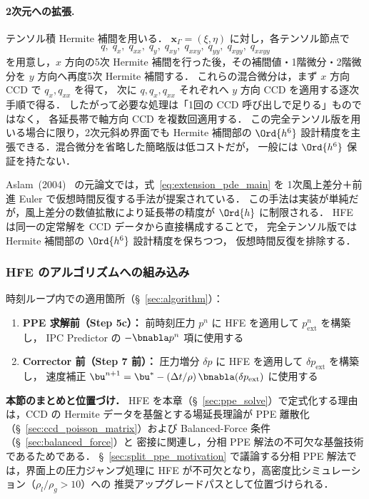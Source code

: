 \paragraph{2次元への拡張.}
テンソル積 Hermite 補間を用いる．
$\bm{x}_\Gamma = (\xi,\eta)$ に対し，各テンソル節点で
\[
  q,\; q_x,\; q_{xx},\; q_y,\; q_{xy},\; q_{xxy},\;
  q_{yy},\; q_{xyy},\; q_{xxyy}
\]
を用意し，$x$ 方向の5次 Hermite 補間を行った後，その補間値・1階微分・2階微分を
$y$ 方向へ再度5次 Hermite 補間する．
これらの混合微分は，まず $x$ 方向 CCD で $q_x,q_{xx}$ を得て，
次に $q,q_x,q_{xx}$ それぞれへ $y$ 方向 CCD を適用する逐次手順で得る．
したがって必要な処理は「1回の CCD 呼び出しで足りる」ものではなく，
各延長帯で軸方向 CCD を複数回適用する．
この完全テンソル版を用いる場合に限り，2次元斜め界面でも Hermite 補間部の
$\Ord{h^6}$ 設計精度を主張できる．混合微分を省略した簡略版は低コストだが，
一般には $\Ord{h^6}$ 保証を持たない．

\begin{tcolorbox}[defbox, title={補足：仮想時間前進による離散化との比較}]
Aslam~(2004)~\cite{Aslam2004} の元論文では，式~\eqref{eq:extension_pde_main} を
1次風上差分＋前進 Euler で仮想時間反復する手法が提案されている．
この手法は実装が単純だが，風上差分の数値拡散により延長帯の精度が $\Ord{h}$ に制限される．
HFE は同一の定常解を CCD データから直接構成することで，
完全テンソル版では Hermite 補間部の $\Ord{h^6}$ 設計精度を保ちつつ，
仮想時間反復を排除する．
\end{tcolorbox}

\subsubsection{HFE のアルゴリズムへの組み込み}

時刻ループ内での適用箇所（§~\ref{sec:algorithm}）：
\begin{enumerate}
  \item \textbf{PPE 求解前（Step 5c）：} 前時刻圧力 $p^n$ に HFE を適用して $p^n_{\mathrm{ext}}$ を構築し，
        IPC Predictor の $-\bnabla p^n$ 項に使用する
  \item \textbf{Corrector 前（Step 7 前）：} 圧力増分 $\delta p$ に HFE を適用して $\delta p_{\mathrm{ext}}$ を構築し，
        速度補正 $\bu^{n+1} = \bu^* - (\Delta t/\rho)\,\bnabla(\delta p_{\mathrm{ext}})$ に使用する
\end{enumerate}

\medskip
\noindent\textbf{本節のまとめと位置づけ．}
HFE を本章（§~\ref{sec:ppe_solve}）で定式化する理由は，CCD の Hermite データを基盤とする場延長理論が
PPE 離散化（§~\ref{sec:ccd_poisson_matrix}）および Balanced-Force 条件（§~\ref{sec:balanced_force}）と
密接に関連し，分相 PPE 解法の不可欠な基盤技術であるためである．
§~\ref{sec:split_ppe_motivation} で議論する分相 PPE 解法では，界面上の圧力ジャンプ処理に
HFE が不可欠となり，高密度比シミュレーション（$\rho_l/\rho_g > 10$）への
推奨アップグレードパスとして位置づけられる．

